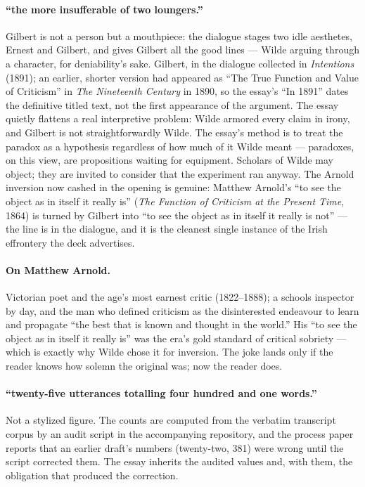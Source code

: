 \documentclass[11pt]{article}
\begin{document}
\paragraph{``the more insufferable of two loungers.''} Gilbert is not a person but a mouthpiece: the dialogue stages two idle aesthetes, Ernest and Gilbert, and gives Gilbert all the good lines — Wilde arguing through a character, for deniability's sake.  Gilbert, in the dialogue collected in \emph{Intentions} (1891); an earlier, shorter version had appeared as ``The True Function and Value of Criticism'' in \emph{The Nineteenth Century} in 1890, so the essay's ``In 1891'' dates the definitive titled text, not the first appearance of the argument. The essay quietly flattens a real interpretive problem: Wilde armored every claim in irony, and Gilbert is not straightforwardly Wilde. The essay's method is to treat the paradox as a hypothesis regardless of how much of it Wilde meant — paradoxes, on this view, are propositions waiting for equipment. Scholars of Wilde may object; they are invited to consider that the experiment ran anyway. The Arnold inversion now cashed in the opening is genuine: Matthew Arnold's ``to see the object as in itself it really is'' (\emph{The Function of Criticism at the Present Time}, 1864) is turned by Gilbert into ``to see the object as in itself it really is not'' — the line is in the dialogue, and it is the cleanest single instance of the Irish effrontery the deck advertises.

\paragraph{On Matthew Arnold.} Victorian poet and the age's most earnest critic (1822--1888); a schools inspector by day, and the man who defined criticism as the disinterested endeavour to learn and propagate ``the best that is known and thought in the world.'' His ``to see the object as in itself it really is'' was the era's gold standard of critical sobriety — which is exactly why Wilde chose it for inversion. The joke lands only if the reader knows how solemn the original was; now the reader does.

\paragraph{``twenty-five utterances totalling four hundred and one words.''} Not a stylized figure. The counts are computed from the verbatim transcript corpus by an audit script in the accompanying repository, and the process paper reports that an earlier draft's numbers (twenty-two, 381) were wrong until the script corrected them. The essay inherits the audited values and, with them, the obligation that produced the correction.
\end{document}
